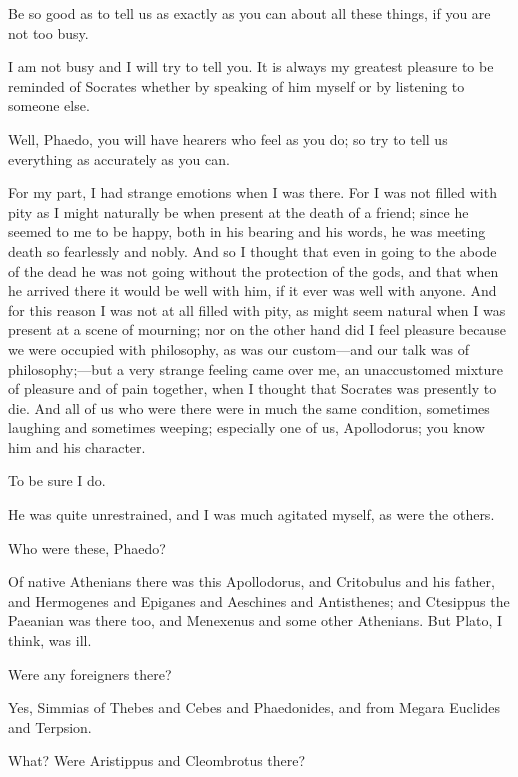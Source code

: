 \documentclass[letterpaper,12pt]{article}
\newcommand{\stephpag}[1]{\marginnote{\small\itshape\fontfamily{ppl}\selectfont #1}}
\begin{document}
\begin{drama}
\echecratesspeaks
Be so good as to tell us as exactly as you can about all these things, if you are not too busy.
 
\phaedospeaks
I am not busy and I will try to tell you. It is always my greatest pleasure to be reminded of Socrates whether by speaking of him myself or by listening to someone else.
 
\echecratesspeaks
Well, Phaedo, you will have hearers who feel as you do; so try to tell us everything as accurately as you can. \stephpag{e}
 
\phaedospeaks
For my part, I had strange emotions when I was there. For I was not filled with pity as I might naturally be when present at the death of a friend; since he seemed to me to be happy, both in his bearing and his words, he was meeting death so fearlessly and nobly. And so I thought that even in going to the abode of the dead he was not going without the protection of the gods, and that when he arrived there \stephpag{59 a} it would be well with him, if it ever was well with anyone. And for this reason I was not at all filled with pity, as might seem natural when I was present at a scene of mourning; nor on the other hand did I feel pleasure because we were occupied with philosophy, as was our custom---and our talk was of philosophy;---but a very strange feeling came over me, an unaccustomed mixture of pleasure and of pain together, when I thought that Socrates was presently to die. And all of us who were there were in much the same condition, sometimes laughing and sometimes weeping; especially one of us, Apollodorus; you know him \stephpag{b} and his character.
 
\echecratesspeaks
To be sure I do.
 
\phaedospeaks
He was quite unrestrained, and I was much agitated myself, as were the others.
 
\echecratesspeaks
Who were these, Phaedo?
 
\phaedospeaks
Of native Athenians there was this Apollodorus, and Critobulus and his father, and Hermogenes and Epiganes and Aeschines and Antisthenes; and Ctesippus the Paeanian was there too, and Menexenus and some other Athenians. But Plato, I think, was ill. \stephpag{c}
 
\echecratesspeaks
Were any foreigners there?
 
\phaedospeaks
Yes, Simmias of Thebes and Cebes and Phaedonides, and from Megara Euclides and Terpsion.
 
\echecratesspeaks
What? Were Aristippus and Cleombrotus there?
 

\end{drama}
\end{document}
